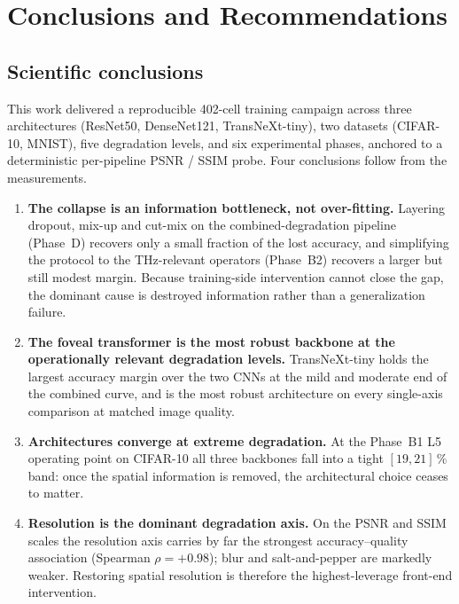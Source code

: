 \section{Conclusions and Recommendations}
\label{sec:conclusions}

\subsection{Scientific conclusions}
This work delivered a reproducible 402-cell training campaign across three
architectures (ResNet50, DenseNet121, TransNeXt-tiny), two datasets (CIFAR-10,
MNIST), five degradation levels, and six experimental phases, anchored to a
deterministic per-pipeline PSNR / SSIM probe. Four conclusions follow from the
measurements.

\begin{enumerate}
  \item \textbf{The collapse is an information bottleneck, not over-fitting.}
        Layering dropout, mix-up and cut-mix on the combined-degradation
        pipeline (Phase~D) recovers only a small fraction of the lost accuracy,
        and simplifying the protocol to the THz-relevant operators (Phase~B2)
        recovers a larger but still modest margin. Because training-side
        intervention cannot close the gap, the dominant cause is destroyed
        information rather than a generalization failure.
  \item \textbf{The foveal transformer is the most robust backbone at the
        operationally relevant degradation levels.} TransNeXt-tiny holds the
        largest accuracy margin over the two CNNs at the mild and moderate end
        of the combined curve, and is the most robust architecture on every
        single-axis comparison at matched image quality.
  \item \textbf{Architectures converge at extreme degradation.} At the Phase~B1
        L5 operating point on CIFAR-10 all three backbones fall into a tight
        $[19,21]\,\%$ band: once the spatial information is removed, the
        architectural choice ceases to matter.
  \item \textbf{Resolution is the dominant degradation axis.} On the PSNR and
        SSIM scales the resolution axis carries by far the strongest
        accuracy--quality association (Spearman $\rho = +0.98$); blur and
        salt-and-pepper are markedly weaker. Restoring spatial resolution is
        therefore the highest-leverage front-end intervention.
\end{enumerate}


